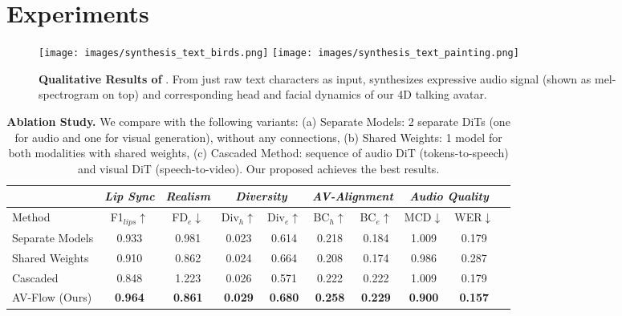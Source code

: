 \section{Experiments}
\label{sec:experiments}

\begin{figure*}[t]
  \centering
   \texttt{[image: images/synthesis\_text\_birds.png]}
   \texttt{[image: images/synthesis\_text\_painting.png]}
   \vspace{-5pt}
   \caption{\textbf{Qualitative Results of \MethodName}. From just raw text characters as input, \MethodName synthesizes expressive audio signal (shown as mel-spectrogram on top) and corresponding head and facial dynamics of our 4D talking avatar.}
   \label{fig:qual_text_melspec_avatar}
\end{figure*}

\begin{table*}[t]
  \centering
  \begin{tabular}{@{}l|ccccccccc@{}}
  \toprule
    & \textit{Lip Sync} & \multicolumn{1}{c}{\textit{Realism}} & \multicolumn{2}{c}{\textit{Diversity}} & \multicolumn{2}{c}{\textit{AV-Alignment}} & \multicolumn{2}{c}{\textit{Audio Quality}} \\
    \midrule
    Method & F1$_{lips}$$\uparrow$ & FD$_{e}$$\downarrow$ & Div$_{h}$$\uparrow$ & Div$_{e}$$\uparrow$ & BC$_{h}$$\uparrow$ & BC$_{e}$$\uparrow$ & MCD$\downarrow$ & WER$\downarrow$ \\
    \midrule
    Separate Models & 0.933 & 0.981 & 0.023 & 0.614 & 0.218 & 0.184 & 1.009 & 0.179 \\
    Shared Weights & 0.910 & 0.862 & 0.024 & 0.664 & 0.208 & 0.174 & 0.986 & 0.287\\
    Cascaded & 0.848 & 1.223 & 0.026 & 0.571 & 0.222 & 0.222 & 1.009 & 0.179 \\
    \midrule
    AV-Flow (Ours) & \textbf{0.964} & \textbf{0.861} & \textbf{0.029} & \textbf{0.680} & \textbf{0.258} & \textbf{0.229} & \textbf{0.900} & \textbf{0.157}\\
    \bottomrule
  \end{tabular}
  \caption{\textbf{Ablation Study.} We compare with the following variants: (a) Separate Models: 2 separate DiTs (one for audio and one for visual generation), without any connections, (b) Shared Weights: 1 model for both modalities with shared weights, (c) Cascaded Method: sequence of audio DiT (tokens-to-speech) and visual DiT (speech-to-video). Our proposed \MethodName achieves the best results.}
  \label{tab:quant_ablation}
  \vspace{-10pt}
\end{table*}



